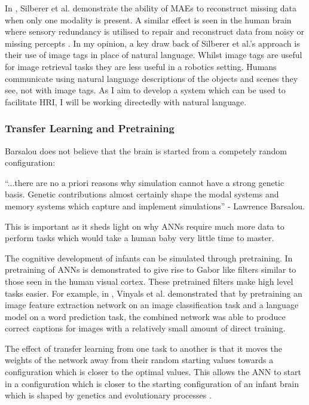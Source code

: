 In \cite{silberer2014learning}, Silberer et al. demonstrate the ability of \acp{MAE} to reconstruct missing data when only one modality is present. A similar effect is seen in the human brain where sensory redundancy is utilised to repair and reconstruct data from noisy or missing percepts \cite{samuel1997lexical}.  In my opinion, a key draw back of Silberer et al.'s approach is their use of image tags in place of natural language. Whilst image tags are useful for image retrieval tasks they are less useful in a robotics setting. Humans communicate using natural language descriptions of the objects and scenes they see, not with image tags. As I aim to develop a system which can be used to facilitate \acl{HRI}, I will be working directedly with natural language.  

\subsubsection{Transfer Learning and Pretraining}

Barsalou \cite{barsalou2008grounded} does not believe that the brain is started from a competely random configuration:
\begin{displayquote}
``...there are no a priori reasons why simulation cannot have a strong genetic basis. Genetic contributions almost certainly shape the modal systems and memory systems which capture and implement simulations'' - Lawrence Barsalou.
\end{displayquote}

This is important as it sheds light on why \acp{ANN} require much more data to perform tasks which would take a human baby very little time to master. 

The cognitive development of infants can be simulated through pretraining. In \cite{lee2008sparse} pretraining of \acp{ANN} is demonstrated to give rise to Gabor like filters similar to those seen in the human visual cortex. These pretrained filters make high level tasks easier. For example, in \cite{vinyals2015show}, Vinyals et al. demonstrated that by pretraining an image feature extraction network on an image classification task and a language model on a word prediction task, the combined network was able to produce correct captions for images with a  relatively small amount of direct training. 

The effect of transfer learning from one task to another is that it moves the weights of the network away from their random starting values towards a configuration which is closer to the optimal values. This allows the \ac{ANN} to start in a configuration which is closer to the starting configuration of an infant brain which is shaped by genetics and evolutionary processes \cite{barsalou2008grounded}.


